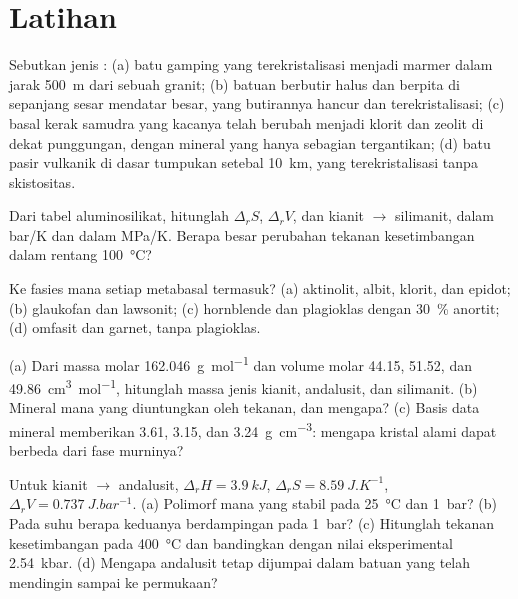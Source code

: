 \section{Latihan}

\begin{exercise}[$\star$]\label{exo:b2:metamorphic-facies:1}
Sebutkan jenis : (a) batu gamping yang terekristalisasi menjadi marmer dalam jarak
\qty{500}{m} dari sebuah granit; (b) batuan berbutir halus dan berpita di sepanjang sesar mendatar
besar, yang butirannya hancur dan terekristalisasi; (c) basal kerak samudra yang
kacanya telah berubah menjadi klorit dan zeolit di dekat punggungan, dengan mineral yang hanya sebagian
tergantikan; (d) batu pasir vulkanik di dasar tumpukan setebal \qty{10}{km}, yang
terekristalisasi tanpa skistositas.
\end{exercise}

\begin{exercise}[$\star$]\label{exo:b2:metamorphic-facies:2}
Dari tabel aluminosilikat, hitunglah $\Delta_r S$, $\Delta_r V$, dan
 kianit $\to$ silimanit, dalam \unit{bar/K} dan dalam \unit{MPa/K}. Berapa
besar perubahan tekanan kesetimbangan dalam rentang \qty{100}{\celsius}?
\end{exercise}

\begin{exercise}[$\star$]\label{exo:b2:metamorphic-facies:3}
Ke fasies mana setiap metabasal termasuk? (a) aktinolit, albit, klorit, dan
epidot; (b) glaukofan dan lawsonit; (c) hornblende dan plagioklas dengan
\qty{30}{\percent} anortit; (d) omfasit dan garnet, tanpa plagioklas.
\end{exercise}

\begin{exercise}[$\star$]\label{exo:b2:metamorphic-facies:4}
(a) Dari massa molar \qty{162.046}{g.mol^{-1}} dan volume molar 44.15, 51.52, dan
\qty{49.86}{cm^3.mol^{-1}}, hitunglah massa jenis kianit, andalusit, dan silimanit.
(b) Mineral mana yang diuntungkan oleh tekanan, dan mengapa? (c) Basis data mineral memberikan 3.61, 3.15, dan
\qty{3.24}{g.cm^{-3}}: mengapa kristal alami dapat berbeda dari fase murninya?
\end{exercise}

\begin{exercise}[$\star\star$]\label{exo:b2:metamorphic-facies:5}
Untuk kianit $\to$ andalusit, $\Delta_r H = \qty{3.9}{kJ}$, $\Delta_r S =
\qty{8.59}{J.K^{-1}}$, $\Delta_r V = \qty{0.737}{J.bar^{-1}}$. (a) Polimorf mana yang
stabil pada \qty{25}{\celsius} dan \qty{1}{bar}? (b) Pada suhu berapa keduanya
berdampingan pada \qty{1}{bar}? (c) Hitunglah tekanan kesetimbangan pada \qty{400}{\celsius} dan
bandingkan dengan nilai eksperimental \qty{2.54}{kbar}. (d) Mengapa andalusit tetap
dijumpai dalam batuan yang telah mendingin sampai ke permukaan?
\end{exercise}

